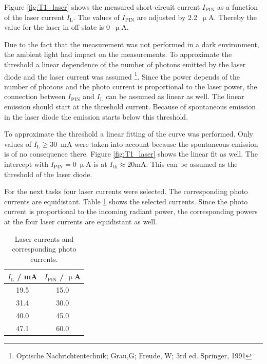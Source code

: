 Figure \ref{fig:T1_laser} shows the measured short-circuit current $I_{\mathrm{PIN}}$ as a function of the laser current $I_{\mathrm{L}}$. The values of $I_{\mathrm{PIN}}$ are adjusted by 2.2~$\upmu$A. Thereby the value for the laser in off-state is 0~$\upmu$A.

Due to the fact that the measurement was not performed in a dark environment, the ambient light had impact on the measurements. To approximate the threshold a linear dependence of the number of photons emitted by the laser diode and the laser current was assumed \footnote[2]{Optische Nachrichtentechnik; Grau,G; Freude, W; 3rd ed. Springer, 1991}. Since the power depends of the number of photons and the photo current is proportional to the laser power, the connection between $I_{\mathrm{PIN}}$ and $I_{\mathrm{L}}$ can be assumed as linear as well. The linear emission should start at the threshold current. Because of spontaneous emission in the laser diode the emission starts below this threshold.

To approximate the threshold a linear fitting of the curve was performed. Only values of $I_{\mathrm{L}} \geq 30$~mA were taken into account because the spontaneous emission is of no consequence there. Figure \ref{fig:T1_laser} shows the linear fit as well. The intercept with $I_{\mathrm{PIN}} = 0~\upmu$A is at $I_{\mathrm{th}} \approx 20$mA. This can be assumed as the threshold of the laser diode.



For the next tasks four laser currents were selected. The corresponding photo currents are equidistant. Table \ref{tab:T1_values} shows the selected currents. Since the photo current is proportional to the incoming radiant power, the corresponding powers at the four laser currents are equidistant as well.


\begin{table}%
\centering
\caption{Laser currents and corresponding photo currents.}

\begin{tabular}{cc}

\toprule
$I_{\mathrm{L}}$ / mA	&	$I_{\mathrm{PIN}}$ / $\upmu$A\\

\midrule

19.5&15.0\\
31.4&30.0\\
40.0&45.0\\
47.1&60.0\\
\bottomrule 
\end{tabular}
\label{tab:T1_values}
\end{table}

